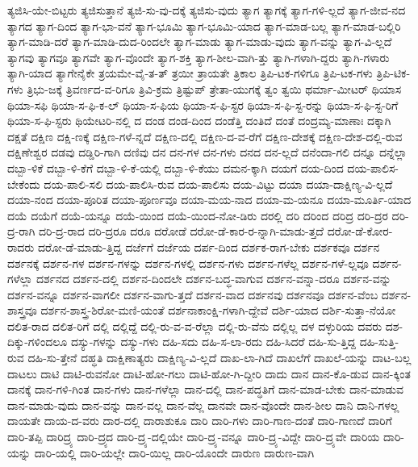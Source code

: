 {ತ್ಯಜಿಸಿ-ಯೇ-ಬಿಟ್ಟರು
ತ್ಯಜಿಸುತ್ತಾನೆ
ತ್ಯಜಿ-ಸು-ವು-ದಕ್ಕೆ
ತ್ಯಜಿಸು-ವುದು
ತ್ಯಾಗ
ತ್ಯಾಗಕ್ಕೆ
ತ್ಯಾಗ-ಗಳಿ-ಲ್ಲದೆ
ತ್ಯಾಗ-ಜೀವ-ನದ
ತ್ಯಾಗದ
ತ್ಯಾಗ-ದಿಂದ
ತ್ಯಾಗ-ಭಾ-ವನೆ
ತ್ಯಾಗ-ಭೂಮಿ
ತ್ಯಾಗ-ಭೂಮಿ-ಯಾದ
ತ್ಯಾಗ-ಮಾಡ-ಬಲ್ಲ
ತ್ಯಾಗ-ಮಾಡ-ಬಲ್ಲಿರಿ
ತ್ಯಾಗ-ಮಾಡಿ-ದರೆ
ತ್ಯಾಗ-ಮಾಡಿ-ದುದ-ರಿಂದಲೇ
ತ್ಯಾಗ-ಮಾಡು
ತ್ಯಾಗ-ಮಾಡು-ವುದು
ತ್ಯಾಗ-ವನ್ನು
ತ್ಯಾಗ-ವಿ-ಲ್ಲದೆ
ತ್ಯಾಗವು
ತ್ಯಾಗವೂ
ತ್ಯಾಗವೇ
ತ್ಯಾಗ-ವೊಂದೇ
ತ್ಯಾಗ-ಶಕ್ತಿ
ತ್ಯಾಗ-ಶೀಲ-ವಾಗಿ-ತ್ತು
ತ್ಯಾಗಿ-ಗಳಾಗಿ-ದ್ದರು
ತ್ಯಾಗಿ-ಗಳಾರು
ತ್ಯಾಗಿ-ಯಾದ
ತ್ಯಾಗೇನೈಕೇ
ತ್ರಯಮೇ-ವೈ-ತ-ತ್
ತ್ರಯೀ
ತ್ರಾಯತೇ
ತ್ರಿಕಾಲ
ತ್ರಿಪಿ-ಟಕ-ಗಳಿಗೂ
ತ್ರಿಪಿ-ಟಕ-ಗಳು
ತ್ರಿಪಿ-ಟಿಕ-ಗಳು
ತ್ರಿಭು-ಜಕ್ಕೆ
ತ್ರಿವರ್ಣದ-ವ-ರಿಗೂ
ತ್ರಿವಿ-ಕ್ರಮ
ತ್ರಿಷ್ಟುಪ್
ತ್ರೇತಾ-ಯುಗಕ್ಕೆ
ತ್ವಂ
ತ್ವಯಿ
ಥರ್ಮಾ-ಮೀಟರ್
ಥಿಯಾಸ
ಥಿಯಾ-ಸಫಿ
ಥಿಯಾ-ಸ-ಫಿ-ಕ-ಲ್
ಥಿಯಾ-ಸ-ಫಿಯ
ಥಿಯಾ-ಸ-ಫಿ-ಸ್ಟರ
ಥಿಯಾ-ಸ-ಫಿ-ಸ್ಟ-ರನ್ನು
ಥಿಯಾ-ಸ-ಫಿ-ಸ್ಟ-ರಿಗೆ
ಥಿಯಾ-ಸ-ಫಿ-ಸ್ಟರು
ಥಿಯೇಟರಿ-ನಲ್ಲಿ
ದ
ದಂಡ
ದಂಡ-ದಿಂದ
ದಂಡೆತ್ತಿ
ದಂತಿದೆ
ದಂತೆ
ದಂದ್ರಮ್ಯ-ಮಾಣಾಃ
ದಕ್ಕಾಗಿ
ದಕ್ಷತೆ
ದಕ್ಷಿಣ
ದಕ್ಷಿ-ಣಕ್ಕೆ
ದಕ್ಷಿಣ-ಗಳೆ-ನ್ನದೆ
ದಕ್ಷಿಣ-ದಲ್ಲಿ
ದಕ್ಷಿಣ-ದ-ವ-ರೆಗೆ
ದಕ್ಷಿಣ-ದೇಶಕ್ಕೆ
ದಕ್ಷಿಣ-ದೇಶ-ದಲ್ಲಿ-ರುವ
ದಕ್ಷಿಣೇಶ್ವರ
ದಡವು
ದಡ್ಡಿರಿ-ಗಾಗಿ
ದಣಿವು
ದನ
ದನ-ಗಳ
ದನ-ಗಳು
ದನದ
ದನ-ಲ್ಲದೆ
ದನೆಂದಾ-ಗಲಿ
ದನ್ನೂ
ದನ್ನೆಲ್ಲಾ
ದಬ್ಬಾ-ಳಿಕೆ
ದಬ್ಬಾ-ಳಿ-ಕೆಗೆ
ದಬ್ಬಾ-ಳಿ-ಕೆ-ಯಲ್ಲಿ
ದಬ್ಬಾ-ಳಿ-ಕೆಯು
ದಮನ-ಕ್ಕಾಗಿ
ದಯಗೆ
ದಯ-ದಿಂದ
ದಯ-ಪಾಲಿಸ-ಬೇಕೆಂದು
ದಯ-ಪಾಲಿ-ಸಲಿ
ದಯ-ಪಾಲಿಸಿ-ರುವ
ದಯ-ಪಾಲಿಸು
ದಯ-ವಿಟ್ಟು
ದಯಾ
ದಯಾ-ದಾಕ್ಷಿಣ್ಯ-ವಿ-ಲ್ಲದೆ
ದಯಾ-ನಂದ
ದಯಾ-ಪೂರಿತ
ದಯಾ-ಪೂರ್ಣವೂ
ದಯಾ-ಮಯ-ನಾದ
ದಯಾ-ಮ-ಯನೂ
ದಯಾ-ಮೂರ್ತಿ-ಯಾದ
ದಯೆ
ದಯೆಗೆ
ದಯೆ-ಯನ್ನೂ
ದಯೆ-ಯಿಂದ
ದಯೆ-ಯಿಂದ-ನೋ-ಡಿರು
ದರಲ್ಲಿ
ದರಿ
ದರಿಂದ
ದರಿದ್ರ
ದರಿ-ದ್ರರ
ದರಿ-ದ್ರ-ರಾಗಿ
ದರಿ-ದ್ರ-ರಾದ
ದರಿ-ದ್ರರೂ
ದರೂ
ದರೋಡೆ
ದರೋ-ಡೆ-ಕಾರ-ರ-ನ್ನಾಗಿ-ಮಾಡು-ತ್ತದೆ
ದರೋ-ಡೆ-ಕೋರ-ರಾದರು
ದರೋ-ಡೆ-ಮಾಡು-ತ್ತಿದ್ದ
ದರ್ಜೆಗೆ
ದರ್ಜೆಯ
ದರ್ಪ-ದಿಂದ
ದರ್ಶಕ-ರಾಗ-ಬೇಕು
ದರ್ಶಕವೂ
ದರ್ಶನ
ದರ್ಶನಕ್ಕೆ
ದರ್ಶನ-ಗಳ
ದರ್ಶನ-ಗಳನ್ನು
ದರ್ಶನ-ಗಳಲ್ಲಿ
ದರ್ಶನ-ಗಳು
ದರ್ಶನ-ಗಳೆಲ್ಲ
ದರ್ಶನ-ಗಳೆ-ಲ್ಲವೂ
ದರ್ಶನ-ಗಳೆಲ್ಲಾ
ದರ್ಶನದ
ದರ್ಶನ-ದಲ್ಲಿ
ದರ್ಶನ-ದಿಂದಲೇ
ದರ್ಶನ-ಬದ್ಧ-ವಾಗುವ
ದರ್ಶನ-ವನ್ನಾ-ದರೂ
ದರ್ಶನ-ವನ್ನು
ದರ್ಶನ-ವನ್ನೂ
ದರ್ಶನ-ವಾಗಲೀ
ದರ್ಶನ-ವಾಗು-ತ್ತದೆ
ದರ್ಶನ-ವಾದ
ದರ್ಶನವು
ದರ್ಶನವೂ
ದರ್ಶನ-ವೆಂಬ
ದರ್ಶನ-ಶಾಸ್ತ್ರವೂ
ದರ್ಶನ-ಶಾಸ್ತ್ರ-ಶಿರೋ-ಮಣಿ-ಯಂತೆ
ದರ್ಶನಾಕಾಂಕ್ಷಿ-ಗಳಾಗಿ-ದ್ದೇವೆ
ದರ್ಶಿ-ಯಾದ
ದರ್ಶಿ-ಸುತ್ತಾ-ನೆಯೋ
ದಲಿತ-ರಾದ
ದಲಿತ-ರಿಗೆ
ದಲ್ಲಿ
ದಲ್ಲಿದ್ದೆ
ದಲ್ಲಿ-ರು-ವ-ವ-ರೆಲ್ಲಾ
ದಲ್ಲಿ-ರು-ವೆನು
ದಲ್ಲಿಲ್ಲ
ದಳ
ದಳ್ಳುರಿಯ
ದವರು
ದಶ-ದಿಕ್ಕು-ಗಳಿಂದಲೂ
ದಸ್ಯು-ಗಳನ್ನು
ದಸ್ಯು-ಗಳು
ದಹಿ-ಸದು
ದಹಿ-ಸ-ಲಾ-ರದು
ದಹಿ-ಸಿದರೆ
ದಹಿ-ಸು-ತ್ತಿದ್ದ
ದಹಿ-ಸುತ್ತಿ-ರುವ
ದಹಿ-ಸು-ತ್ತೇನೆ
ದಹ್ಧತಿ
ದಾಕ್ಷಿಣಾತ್ಯರು
ದಾಕ್ಷಿಣ್ಯ-ವಿ-ಲ್ಲದೆ
ದಾಖ-ಲಾ-ಗಿದೆ
ದಾಖಲೆಗೆ
ದಾಖಲೆ-ಯನ್ನು
ದಾಟ-ಬಲ್ಲ
ದಾಟಲು
ದಾಟಿ
ದಾಟಿ-ರುವನೋ
ದಾಟಿ-ಹೋ-ಗಲು
ದಾಟಿ-ಹೋ-ಗಿ-ದ್ದೀರಿ
ದಾದು
ದಾನ
ದಾನ-ಕೊ-ಡುವ
ದಾನ-ಕ್ಕಿಂತ
ದಾನಕ್ಕೆ
ದಾನ-ಗಳಿ-ಗಿಂತ
ದಾನ-ಗಳು
ದಾನ-ಗಳೆಲ್ಲಾ
ದಾನ-ದಲ್ಲಿ
ದಾನ-ಪದ್ಧತಿಗೆ
ದಾನ-ಮಾಡ-ಬೇಕು
ದಾನ-ಮಾಡುವ
ದಾನ-ಮಾಡು-ವುದು
ದಾನ-ವನ್ನು
ದಾನ-ವಲ್ಲ
ದಾನ-ವೆಲ್ಲ
ದಾನವೇ
ದಾನ-ವೊಂದೇ
ದಾನ-ಶೀಲ
ದಾನಿ
ದಾನಿ-ಗಳಲ್ಲ
ದಾಯತೇ
ದಾಯ-ದ-ವರು
ದಾರ-ದಲ್ಲಿ
ದಾರಾಶುಕೂ
ದಾರಿ
ದಾರಿ-ಗಳು
ದಾರಿ-ಗಾಣ-ದಂತೆ
ದಾರಿ-ಗಾಣದೆ
ದಾರಿಗೆ
ದಾರಿ-ತಪ್ಪಿ
ದಾರಿದ್ರ್ಯ
ದಾರಿ-ದ್ರ್ಯದ
ದಾರಿ-ದ್ರ್ಯ-ದಲ್ಲಿಯೇ
ದಾರಿ-ದ್ರ್ಯ-ವನ್ನೂ
ದಾರಿ-ದ್ರ್ಯ-ವಿದ್ದೇ
ದಾರಿ-ದ್ರ್ಯವೇ
ದಾರಿಯ
ದಾರಿ-ಯನ್ನು
ದಾರಿ-ಯಲ್ಲಿ
ದಾರಿ-ಯಲ್ಲೇ
ದಾರಿ-ಯಿಲ್ಲ
ದಾರಿ-ಯೊಂದೇ
ದಾರುಣ
ದಾರುಣ-ವಾಗಿ
}

